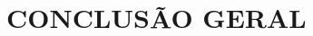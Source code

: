 \artigofalse
\chapter{CONCLUSÃO GERAL}
\label{chap:conclusion}

\blindtext[2]

\blindtext[2]

\blindtext[2]
